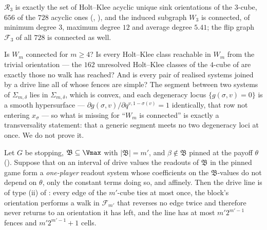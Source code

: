 \begin{proposition}[$W_3$ is connected]\label{mw:w3}
$\mathcal R_3$ is exactly the set of Holt--Klee acyclic unique sink
orientations of the $3$-cube, $656$ of the $728$ acyclic ones
(, ), and the induced subgraph
$W_3$ is connected, of minimum degree $3$, maximum degree $12$ and average
degree $5.41$; the flip graph $\mathcal F_3$ of all $728$ is connected as
well.
\end{proposition}

\begin{remark}\label{mw:open}
Is $W_m$ connected for $m\ge4$? Is every Holt--Klee class reachable in $W_m$
from the trivial orientation --- the $162$ unresolved Holt--Klee classes of
the $4$-cube of  are exactly those no walk has reached?
And is every pair of realised systems joined by a drive line all of whose
fences are simple? The segment between two systems of $\Sigma_{m,\delta}$
lies in $\Sigma_{m,\delta}$, which is convex, and each degeneracy locus
$\{g(\sigma,v)=0\}$ is a smooth hypersurface ---
$\partial g(\sigma,v)/\partial q^{v,1-\sigma(v)}=1$ identically, that row not
entering $x_\sigma$ --- so what is missing for ``$W_m$ is connected'' is
exactly a transversality statement: that a generic segment meets no two
degeneracy loci at once. We do not prove it.
\end{remark}

\begin{corollary}\label{mw:drive-return}
Let $G$ be stopping, $\mathfrak B\subseteq\Vmax$ with $|\mathfrak B|=m'$, and
$\beta\notin\mathfrak B$ pinned at the payoff $\theta$ ().
Suppose that on an interval of drive values the readouts of $\mathfrak B$ in
the pinned game form a \emph{one-player} readout system whose coefficients on
the $\mathfrak B$-values do not depend on $\theta$, only the constant terms
doing so, and affinely. Then the drive line is of type (ii) of
: every edge of the $m'$-cube ties at most once, the
block's orientation performs a walk in $\mathcal F_{m'}$ that reverses no
edge twice and therefore never returns to an orientation it has left, and the
line has at most $m'2^{m'-1}$ fences and $m'2^{m'-1}+1$ cells.
\end{corollary}

